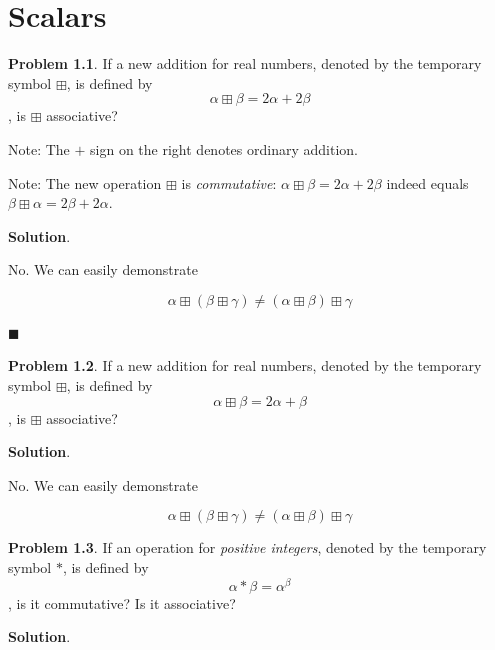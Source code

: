 \documentclass[english,notitlepage,smartquotes]{hgbreport}
\theoremstyle{definition}
\theoremstyle{problem}
\newtheorem{problem}{Problem}
\theoremstyle{remark}
\theoremstyle{plain}
\begin{document}
\tableofcontents

\chapter{Scalars}
\begin{problem}
\label{pr:2a2b}
If a new addition for real numbers, denoted by the temporary symbol $\boxplus$, is defined by
$$
\alpha\boxplus\beta=2\alpha+2\beta
$$
, is $\boxplus$ associative?

Note: The $+$ sign on the right denotes ordinary addition.

Note: The new operation $\boxplus$ is \textit{commutative}: $\alpha\boxplus\beta=2\alpha+2\beta$ indeed equals $\beta\boxplus\alpha=2\beta+2\alpha$.
\end{problem}

\textbf{Solution}.

No. We can easily demonstrate 

$$
\alpha\boxplus(\beta\boxplus\gamma)\ne(\alpha\boxplus\beta)\boxplus\gamma
$$


$\blacksquare$

\begin{problem}
\label{pr:a2b}
If a new addition for real numbers, denoted by the temporary symbol $\boxplus$, is defined by
$$
\alpha\boxplus\beta=2\alpha+\beta
$$
, is $\boxplus$ associative?
\end{problem}

\textbf{Solution}.

No. We can easily demonstrate 

$$
\alpha\boxplus(\beta\boxplus\gamma)\ne(\alpha\boxplus\beta)\boxplus\gamma
$$

\begin{problem}
\label{pr:atob}
If an operation for \emph{positive integers}, denoted by the temporary symbol $*$, is defined by
$$
\alpha*\beta=\alpha^\beta
$$
, is it commutative? Is it associative?
\end{problem}

\textbf{Solution}.
\end{document}
